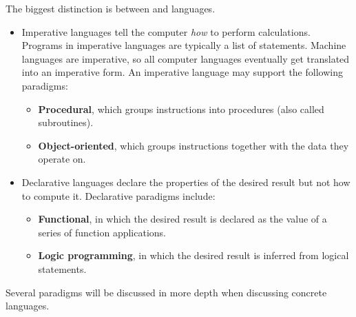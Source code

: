 The biggest distinction is between  and  languages. 
\begin{itemize}
\item Imperative languages tell the computer \textit{how} to perform calculations. Programs in imperative languages are typically a list of statements. Machine languages are imperative, so all computer languages eventually get translated into an imperative form. An imperative language may support the following paradigms:
\begin{itemize}
\item \textbf{Procedural}, which groups instructions into procedures (also called subroutines).
\item \textbf{Object-oriented},  which groups instructions together with the data they operate on.
\end{itemize}
\item Declarative languages declare the properties of the desired result but not how to compute it. Declarative paradigms include:
\begin{itemize}
\item \textbf{Functional}, in which the desired result is declared as the value of a series of function applications.
\item \textbf{Logic programming}, in which the desired result is inferred from logical statements.
\end{itemize}
\end{itemize}

Several paradigms will be discussed in more depth when discussing concrete languages.

